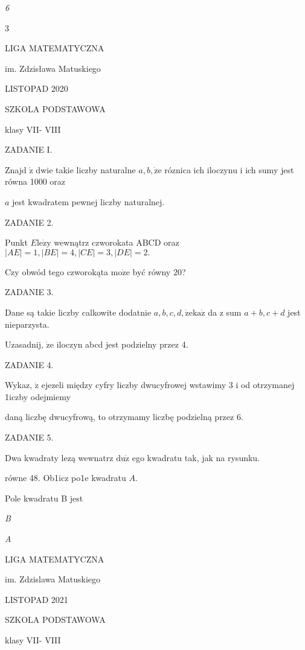 \documentclass[a4paper,12pt]{article}
\begin{document}
{\it 6}

3






LIGA MATEMATYCZNA

im. Zdzisława Matuskiego

LISTOPAD 2020

SZKOLA PODSTAWOWA

klasy VII- VIII

ZADANIE I.

Znajd $\acute{\mathrm{z}}$ dwie takie liczby naturalne $a, b, \dot{\mathrm{z}}\mathrm{e}$ róznica ich iloczynu i ich sumy jest równa 1000 oraz

$a$ jest kwadratem pewnej liczby naturalnej.

ZADANIE 2.

Punkt $E\mathrm{l}\mathrm{e}\dot{\mathrm{z}}\mathrm{y}$ wewnątrz czworokata ABCD oraz $|AE| = 1, |BE| =4, |CE| =3, |DE| =2.$

Czy obwód tego czworokąta $\mathrm{m}\mathrm{o}\dot{\mathrm{z}}\mathrm{e}$ być równy 20?

ZADANIE 3.

Dane są takie liczby calkowite dodatnie $a, b, c, d, \dot{\mathrm{z}}\mathrm{e}\mathrm{k}\mathrm{a}\dot{\mathrm{z}}$ da z sum $a+b, c+d$ jest nieparzysta.

Uzasadnij, $\dot{\mathrm{z}}\mathrm{e}$ iloczyn abcd jest podzielny przez 4.

ZADANIE 4.

Wykaz, $\dot{\mathrm{z}}$ ejezeli między cyfry liczby dwucyfrowej wstawimy 3 i od otrzymanej 1iczby odejmiemy

daną liczbę dwucyfrową, to otrzymamy liczbę podzielną przez 6.

ZADANIE 5.

Dwa kwadraty lezą wewnatrz $\mathrm{d}\mathrm{u}\dot{\mathrm{z}}$ ego kwadratu tak, jak na rysunku.

równe 48. Ob1icz po1e kwadratu $A.$

Pole kwadratu B jest

{\it B}

{\it A}






LIGA MATEMATYCZNA

im. Zdzislawa Matuskiego

LISTOPAD 2021

SZKOLA PODSTAWOWA

klasy VII- VIII
\end{document}
